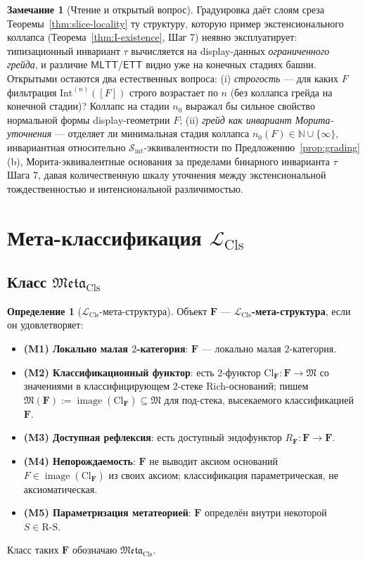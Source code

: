 \documentclass[11pt]{article}
\theoremstyle{plain}
\theoremstyle{definition}
\newtheorem{definition}[theorem]{Определение}
\newtheorem{remark}[theorem]{Замечание}
\newcommand{\RS}{\mathrm{R\text{-}S}}
\newcommand{\cS}{\mathcal{S}}
\newcommand{\fM}{\mathfrak{M}}
\newcommand{\Meta}{\mathfrak{Meta}}
\newcommand{\LCls}{\mathcal{L}_{\mathrm{Cls}}}
\newcommand{\Sint}{\cS_{\mathrm{int}}}
\newcommand{\Cl}{\mathrm{Cl}}
\newcommand{\MLTT}{\mathsf{MLTT}}
\newcommand{\ETT}{\mathsf{ETT}}
\DeclareMathOperator{\image}{image}
\begin{document}
\begin{remark}[Чтение и открытый вопрос]\label{rem:grading-open}
Градуировка даёт слоям среза Теоремы~\ref{thm:slice-locality} ту структуру, которую пример экстенсионального коллапса (Теорема~\ref{thm:I-existence}, Шаг 7) неявно эксплуатирует: типизационный инвариант $\tau$ вычисляется на display-данных \emph{ограниченного грейда}, и различие $\MLTT$/$\ETT$ видно уже на конечных стадиях башни. Открытыми остаются два естественных вопроса: (i) \emph{строгость} --- для каких $F$ фильтрация $\mathrm{Int}^{(n)}([F])$ строго возрастает по $n$ (без коллапса грейда на конечной стадии)? Коллапс на стадии $n_0$ выражал бы сильное свойство нормальной формы display-геометрии $F$; (ii) \emph{грейд как инвариант Морита-уточнения} --- отделяет ли минимальная стадия коллапса $n_0(F) \in \mathbb{N} \cup \{\infty\}$, инвариантная относительно $\Sint$-эквивалентности по Предложению~\ref{prop:grading}(b), Морита-эквивалентные основания за пределами бинарного инварианта $\tau$ Шага 7, давая количественную шкалу уточнения между экстенсиональной тождественностью и интенсиональной различимостью.
\end{remark}

\section{\texorpdfstring{Мета-классификация $\LCls$}{Мета-классификация классификаторов}}\label{sec:meta}

\subsection{\texorpdfstring{Класс $\Meta_{\mathrm{Cls}}$}{Класс Meta\_Cls}}

\begin{definition}[$\LCls$-мета-структура]\label{def:meta}
Объект $\mathbf{F}$ — \textbf{$\LCls$-мета-структура}, если он удовлетворяет:
\begin{itemize}
\item \textbf{(M1) Локально малая $2$-категория}: $\mathbf{F}$ — локально малая $2$-категория.
\item \textbf{(M2) Классификационный функтор}: есть $2$-функтор $\Cl_{\mathbf{F}} : \mathbf{F} \to \fM$ со значениями в классифицирующем $2$-стеке Rich-оснований; пишем $\fM(\mathbf{F}) := \image(\Cl_{\mathbf{F}}) \subseteq \fM$ для под-стека, высекаемого классификацией $\mathbf{F}$.
\item \textbf{(M3) Доступная рефлексия}: есть доступный эндофунктор $R_{\mathbf{F}} : \mathbf{F} \to \mathbf{F}$.
\item \textbf{(M4) Непорождаемость}: $\mathbf{F}$ не выводит аксиом оснований $F \in \image(\Cl_{\mathbf{F}})$ из своих аксиом; классификация параметрическая, не аксиоматическая.
\item \textbf{(M5) Параметризация метатеорией}: $\mathbf{F}$ определён внутри некоторой $S \in \RS$.
\end{itemize}
Класс таких $\mathbf{F}$ обозначаю $\Meta_{\mathrm{Cls}}$.
\end{definition}
\end{document}
